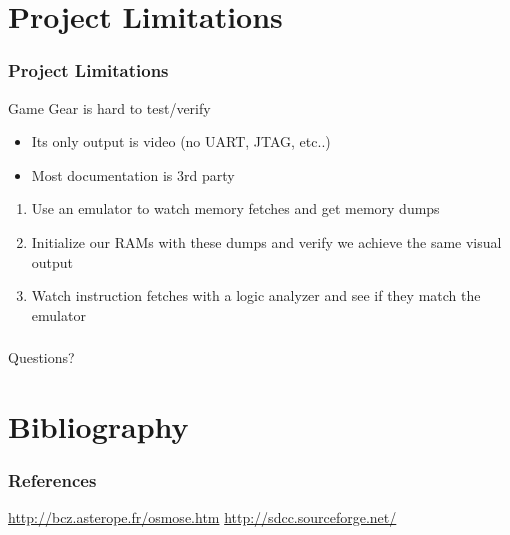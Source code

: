 \documentclass{beamer}
\newlength{\wideitemsep}
\let\olditem\item
\renewcommand{\item}{\setlength{\itemsep}{\wideitemsep}\olditem}
\begin{document}
\section{Project Limitations}
\begin{frame}
    \frametitle{Project Limitations}
    Game Gear is hard to test/verify
    \begin{itemize}
            \olditem<2-> Its only output is video (no UART, JTAG, etc..)
            \olditem<3-> Most documentation is 3rd party
    \end{itemize}
    \vspace{0.25cm}
    \begin{enumerate}
        \olditem<5-> Use an emulator to watch memory fetches and get memory dumps
        \olditem<6-> Initialize our RAMs with these dumps and verify we achieve the same visual output
        \olditem<7-> Watch instruction fetches with a logic analyzer and see if they match the emulator
    \end{enumerate}
    \vspace{0.25cm}
\end{frame}

\begin{frame}
\frametitle{}
    \begin{center}
        \Huge
        Questions?
    \end{center}
\end{frame}

\newpage

\section{Bibliography}
\begin{frame}
    \frametitle{References}
    \begin{thebibliography}{9}
             \url{http://bcz.asterope.fr/osmose.htm}
             \url{http://sdcc.sourceforge.net/}
    \end{thebibliography}
\end{frame}
\end{document}
